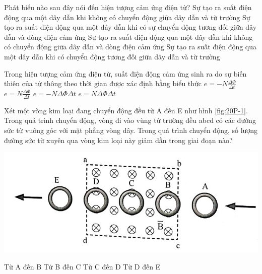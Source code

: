 \begin{ex}
	Phát biểu nào sau đây nói đến hiện tượng cảm ứng điện từ?
	\choice
	{Sự tạo ra suất điện động qua một dây dẫn khi không có chuyển động giữa dây dẫn và từ trường}
	{Sự tạo ra suất điện động qua một dây dẫn khi có sự chuyển động tương đối giữa dây dẫn và dòng điện cảm ứng}
	{Sự tạo ra suất điện động qua một dây dẫn khi không có chuyển động giữa dây dẫn và dòng điện cảm ứng}
	{\True Sự tạo ra suất điện động qua một dây dẫn khi có chuyển động tương đối giữa dây dẫn và từ trường}
	\loigiai{}
\end{ex}
\begin{ex}
	Trong hiện tượng cảm ứng điện từ, suất điện động cảm ứng sinh ra do sự biến thiên của từ thông theo thời gian được xác định bằng biểu thức
	\choice
	{\True $e=-N \frac{\Delta \Phi}{\Delta t}$}
	{$e=N \frac{\Delta \Phi}{\Delta t}$}
	{$e=-N \Delta \Phi \Delta t$}
	{$e=N \Delta \Phi \Delta t$}
	\loigiai{
		
	}
\end{ex}
\begin{ex}
	Xét một vòng kim loại đang chuyển động đều từ A đến E như hình \ref{fig:20P-1}. Trong quá trình chuyển động, vòng đi vào vùng từ trường đều abcd có các đường sức từ vuông góc với mặt phẳng vòng dây. Trong quá trình chuyển động, số lượng đường sức từ xuyên qua vòng kim loại này giảm dần trong giai đoạn nào?
	\begin{center}
		\includegraphics[width=0.4\linewidth]{figs/VN12-Y24-PH-SYL-020P-1}
		\label{fig:20P-1}
	\end{center}
	\choice
	{Từ A đến B}
	{Từ B đến C}
	{Từ C đến D}
	{\True Từ D đến E}
	\loigiai{
		
	}
\end{ex}
